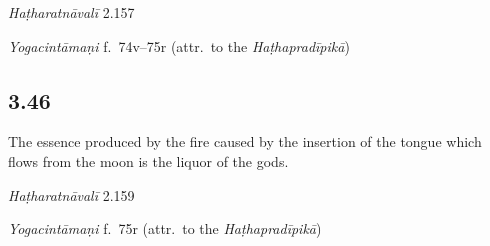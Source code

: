 \begin{ekdosis}

\begin{testimonia}[hp03_045]
\emph{Haṭharatnāvalī} 2.157
\begin{versinnote}
\end{versinnote}

\emph{Yogacintāmaṇi} f.~74v–75r (attr.~to the \emph{Haṭhapradīpikā})
\begin{versinnote}
\end{versinnote}

\end{testimonia}


\subsection*{3.46}
\begin{translation}[hp03_046]
The essence produced by the fire caused by the insertion of the tongue which flows from the moon is the liquor of the gods.
\end{translation}


\begin{testimonia}[hp03_046]
\emph{Haṭharatnāvalī} 2.159

\begin{versinnote}
\end{versinnote}

\emph{Yogacintāmaṇi} f.~75r (attr.~to the \emph{Haṭhapradīpikā})
\begin{versinnote}
\end{versinnote}


\end{testimonia}
\end{ekdosis}
